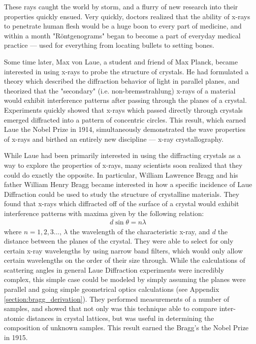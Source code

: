 \documentclass[%
 reprint,
 amsmath,amssymb,
 aps,
 pra,
]{revtex4-1}
\begin{document}
These rays caught the world by storm, and a flurry of new research into their properties quickly ensued. Very quickly, doctors realized that the ability of x-rays to penetrate human flesh would be a huge boon to every part of medicine, and within a month "R\"{o}ntgenograms" began to become a part of everyday medical practice --- used for everything from locating bullets to setting bones\cite{xray_history}.

Some time later, Max von Laue, a student and friend of Max Planck, became interested in using x-rays to probe the structure of crystals. He had formulated a theory which described the diffraction behavior of light in parallel planes, and theorized that the "secondary" (i.e. non-bremsstrahlung) x-rays of a material would exhibit interference patterns after passing through the planes of a crystal. Experiments quickly showed that x-rays which passed directly through crystals emerged diffracted into a pattern of concentric circles. This result, which earned Laue the Nobel Prize in 1914, simultaneously demonstrated the wave properties of x-rays and birthed an entirely new discipline --- x-ray crystallography\cite{laue}. 

While Laue had been primarily interested in using the diffracting crystals as a way to explore the properties of x-rays, many scientists soon realized that they could do exactly the opposite. In particular, William Lawrence Bragg and his father William Henry Bragg became interested in how a specific incidence of Laue Diffraction could be used to study the structure of crystalline materials. They found that x-rays which diffracted off of the surface of a crystal would exhibit interference patterns with maxima given by the following relation:
\begin{gather}\label{eq:bragg}
	d\sin\theta = n \lambda
\end{gather}
where $n = 1,2,3...$, $\lambda$ the wavelength of the characteristic x-ray, and $d$ the distance between the planes of the crystal. They were able to select for only certain x-ray wavelengths by using narrow band filters, which would only allow certain wavelengths on the order of their size through. While the calculations of scattering angles in general Laue Diffraction experiments were incredibly complex, this simple case could be modeled by simply assuming the planes were parallel and going simple geometrical optics calculations\cite{bragg} (see Appendix \ref{section:bragg_derivation}). They performed measurements of a number of samples, and showed that not only was this technique able to compare inter-atomic distances in crystal lattices, but was useful in determining the composition of unknown samples. This result earned the Bragg's the Nobel Prize in 1915.
\end{document}
